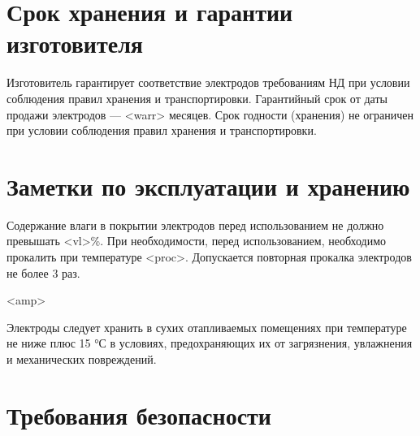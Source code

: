 \documentclass[russian,utf8,pointsection,nocolumnxxxi,nocolumnxxxii,12pt]{eskdtext}
\begin{document}
\section{Срок хранения и гарантии изготовителя}

Изготовитель гарантирует соответствие электродов требованиям НД при условии соблюдения правил хранения и транспортировки. Гарантийный срок от даты продажи электродов — <warr> месяцев. 
Срок годности (хранения) не ограничен при условии соблюдения правил хранения и транспортировки.

\section{Заметки по эксплуатации и хранению}

Содержание влаги в покрытии электродов перед использованием не должно превышать <vl>\%.
При необходимости, перед использованием, необходимо прокалить при температуре <proc>. Допускается повторная прокалка электродов не более 3 раз.

<amp>

Электроды следует хранить в сухих отапливаемых помещениях при температуре не ниже плюс 15 °С в условиях, предохраняющих их от загрязнения, увлажнения и механических повреждений.

\section{Требования безопасности}
\end{document}
